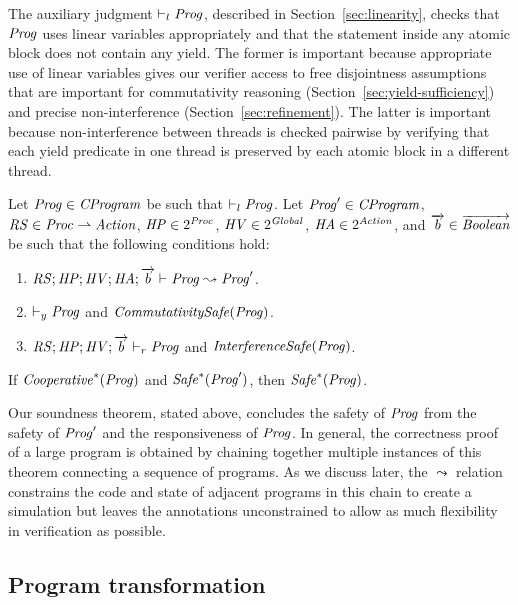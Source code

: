 The auxiliary judgment $\vdash_l \mathit{Prog}$, described in Section~\ref{sec:linearity}, 
checks that $\mathit{Prog}$ uses linear variables appropriately and that the statement
inside any atomic block does not contain any yield.
The former is important because appropriate use of linear variables gives our verifier access to free disjointness
assumptions that are important for commutativity reasoning (Section~\ref{sec:yield-sufficiency})
and precise non-interference (Section~\ref{sec:refinement}).
The latter is important because non-interference between threads is checked pairwise by verifying that each yield predicate
in one thread is preserved by each atomic block in a different thread.

\begin{theorem}
\label{thm:correctness}
Let $\mathit{Prog} \in \mathit{CProgram}$ be such that $\vdash_l \mathit{Prog}$.
Let $\mathit{Prog}' \in \mathit{CProgram}$, $\mathit{RS} \in \mathit{Proc} \rightharpoonup \mathit{Action}$, $\mathit{HP} \in 2^{\mathit{Proc}}$, 
$\mathit{HV} \in 2^{\mathit{Global}}$, $\mathit{HA} \in 2^{\mathit{Action}}$,
and $\overrightarrow{b} \in \overrightarrow{\mathit{Boolean}}$ be such that the following conditions hold:
\begin{enumerate}
\item
$\mathit{RS};\mathit{HP};\mathit{HV};\mathit{HA};\overrightarrow{b} \vdash \mathit{Prog} \leadsto \mathit{Prog}'$.
\item
$\vdash_y \mathit{Prog}$ and $\mathit{CommutativitySafe}(\mathit{Prog})$.
\item
$\mathit{RS};\mathit{HP};\mathit{HV};\overrightarrow{b} \vdash_r \mathit{Prog}$ and $\mathit{InterferenceSafe}(\mathit{Prog})$.
\end{enumerate}
If $\mathit{Cooperative}^*(\mathit{Prog})$ and $\mathit{Safe}^*(\mathit{Prog}')$, then $\mathit{Safe}^*(\mathit{Prog})$.
\end{theorem}

Our soundness theorem, stated above, concludes the safety of $\mathit{Prog}$ from the safety of $\mathit{Prog}'$ 
and the responsiveness of $\mathit{Prog}$.
In general, the correctness proof of a large program is obtained by chaining together
multiple instances of this theorem connecting a sequence of programs.  
As we discuss later, the $\leadsto$ relation constrains the code and state of adjacent programs in this chain 
to create a simulation but leaves the annotations unconstrained to allow as much flexibility in verification as possible.

\subsection{Program transformation}
\label{sec:program-transformation}

